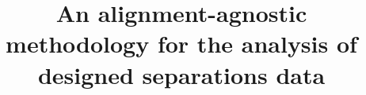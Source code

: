 \documentclass[preprint,12pt]{elsarticle}
\begin{document}
\begin{frontmatter}



\title{An alignment-agnostic methodology for the analysis of designed separations data}



\end{frontmatter}
\end{document}
